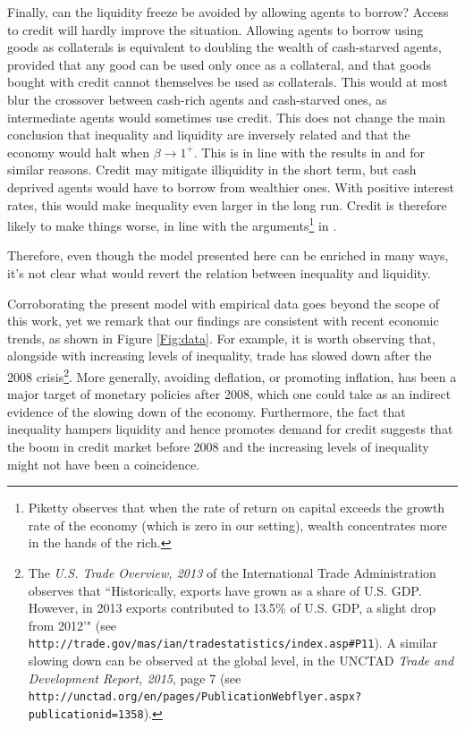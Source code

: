Finally, can the liquidity freeze be avoided by allowing agents to borrow? Access to credit will hardly improve the situation. Allowing agents to borrow using goods as collaterals is equivalent to doubling the
wealth of cash-starved agents, provided that any good can be used only once as a collateral, and that goods bought with credit cannot themselves be used as collaterals.  This would at most blur the crossover between cash-rich agents and cash-starved ones, as intermediate agents would sometimes use credit. This does not change the main conclusion that inequality and liquidity are inversely related and that the economy would halt when $\beta \to 1^{+}$. This is in line with the results in \cite{Yakovenko2009Review} and for similar reasons. Credit may mitigate illiquidity in the short term, but cash deprived agents would have to borrow from wealthier ones. With positive interest rates, this would make inequality even larger in the long run. Credit is therefore likely to make things worse, in line with the arguments\footnote{Piketty \cite{Piketty2014} observes that when the rate of return on capital exceeds the growth rate of the economy (which is zero in our setting), wealth concentrates more in the hands of the rich.} in \cite{Piketty2014}.

Therefore, even though the model presented here can be enriched in many ways, it's not clear what would revert the relation between inequality and liquidity. 

Corroborating the present model with empirical data goes beyond the scope of this work, yet we remark that our findings are consistent with recent economic trends, as shown in Figure \ref{Fig:data}.  For example, it is worth observing that, alongside with increasing levels of inequality, trade 
has slowed down after the 2008 crisis\footnote{The {\em U.S. Trade Overview, 2013} of the International Trade Administration observes that ``Historically, exports have grown as a share of U.S. GDP. However, in 2013 exports contributed to 13.5\% of U.S. GDP, a slight drop from 2012'" (see {\tt http://trade.gov/mas/ian/tradestatistics/index.asp{\#P}11}). A similar slowing down can be observed at the global level, in the UNCTAD {\em Trade and Development Report, 2015}, page 7 (see {\tt http://unctad.org/en/pages/PublicationWebflyer.aspx?publicationid=1358}).}. More generally, avoiding deflation, or promoting inflation,  has been a major target of monetary policies after 2008, which one could take as an indirect evidence of the slowing down of the economy.  Furthermore, the fact that inequality hampers liquidity and hence promotes demand for credit suggests that the boom in credit market before 2008 and the increasing levels of inequality might not have been a coincidence. 

